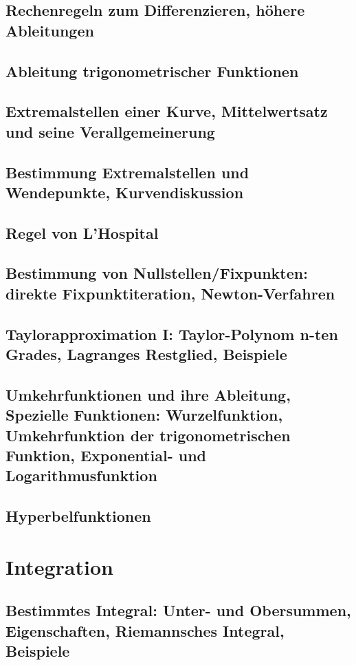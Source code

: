 \subsection{Rechenregeln zum Differenzieren, höhere Ableitungen}
\subsection{Ableitung trigonometrischer Funktionen}
\subsection{Extremalstellen einer Kurve, Mittelwertsatz und seine Verallgemeinerung}
\subsection{Bestimmung Extremalstellen und Wendepunkte, Kurvendiskussion}
\subsection{Regel von L’Hospital}
\subsection{Bestimmung von Nullstellen/Fixpunkten: direkte Fixpunktiteration, Newton-Verfahren}
\subsection{Taylorapproximation I: Taylor-Polynom n-ten Grades, Lagranges Restglied, Beispiele}
\subsection{Umkehrfunktionen und ihre Ableitung, Spezielle Funktionen: Wurzelfunktion, Umkehrfunktion der trigonometrischen Funktion, Exponential- und Logarithmusfunktion}
\subsection{Hyperbelfunktionen}

\section{Integration}
\subsection{Bestimmtes Integral: Unter- und Obersummen, Eigenschaften, Riemannsches Integral, Beispiele}

